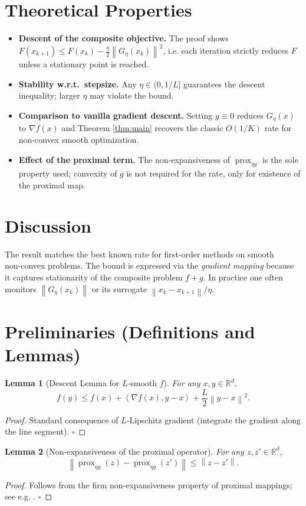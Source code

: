 \documentclass{article}
\newtheorem{lemma}{Lemma}
\newcommand{\prox}{\operatorname{prox}}
\newcommand{\grad}{\nabla}
\newcommand{\norm}[1]{\left\lVert #1\right\rVert}
\newcommand{\inner}[2]{\left\langle #1,#2\right\rangle}
\newcommand{\R}{\mathbb{R}}
\begin{document}
\section*{Theoretical Properties}
\begin{itemize}
    \item \textbf{Descent of the composite objective.} The proof shows $F(x_{k+1})\le F(x_{k})-\frac{\eta}{2}\norm{G_{\eta}(x_{k})}^{2}$, i.e. each iteration strictly reduces $F$ unless a stationary point is reached.
    \item \textbf{Stability w.r.t.\ stepsize.} Any $\eta\in(0,1/L]$ guarantees the descent inequality; larger $\eta$ may violate the bound.
    \item \textbf{Comparison to vanilla gradient descent.} Setting $g\equiv0$ reduces $G_{\eta}(x)$ to $\grad f(x)$ and Theorem \ref{thm:main} recovers the classic $O(1/K)$ rate for non‑convex smooth optimization.
    \item \textbf{Effect of the proximal term.} The non‑expansiveness of $\prox_{\eta g}$ is the sole property used; convexity of $g$ is not required for the rate, only for existence of the proximal map.
\end{itemize}

\section*{Discussion}
The result matches the best known rate for first‑order methods on smooth non‑convex problems. The bound is expressed via the \emph{gradient mapping} because it captures stationarity of the composite problem $f+g$. In practice one often monitors $\norm{G_{\eta}(x_{k})}$ or its surrogate $\norm{x_{k}-x_{k+1}}/\eta$.

\section*{Preliminaries (Definitions and Lemmas)}
\begin{lemma}[Descent Lemma for $L$‑smooth $f$]\label{lem:descent}
For any $x,y\in\R^{d}$,
\[
f(y)\le f(x)+\inner{\grad f(x)}{y-x}+\frac{L}{2}\norm{y-x}^{2}.
\]
\end{lemma}
\begin{proof}
Standard consequence of $L$‑Lipschitz gradient (integrate the gradient along the line segment). \hfill $\square$
\end{proof}

\begin{lemma}[Non‑expansiveness of the proximal operator]\label{lem:nonexp}
For any $z,z'\in\R^{d}$,
\[
\norm{\prox_{\eta g}(z)-\prox_{\eta g}(z')}\le\norm{z-z'}.
\]
\end{lemma}
\begin{proof}
Follows from the firm non‑expansiveness property of proximal mappings; see e.g. \cite{parikh2014proximal}. \hfill $\square$
\end{proof}
\end{document}

